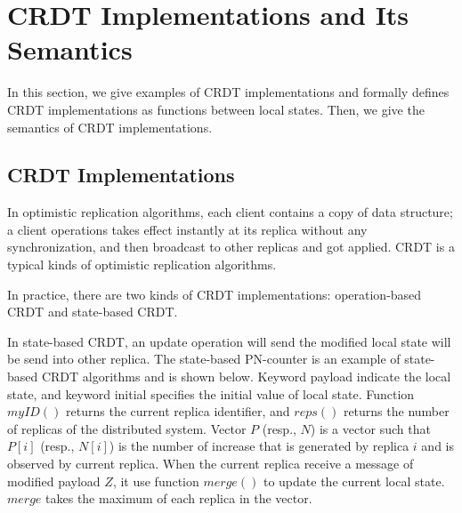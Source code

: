 
\section{CRDT Implementations and Its Semantics}
\label{sec:CRDT implementations and its semantics}

In this section, we give examples of CRDT implementations and formally defines CRDT implementations as functions between local states. Then, we give the semantics of CRDT implementations.


\subsection{CRDT Implementations}
\label{subsec:CRDT implementations}

In optimistic replication algorithms, each client contains a copy of data structure; a client operations takes effect instantly at its replica without any synchronization, and then broadcast to other replicas and got applied. CRDT is a typical kinds of optimistic replication algorithms. 

In practice, there are two kinds of CRDT implementations: operation-based CRDT and state-based CRDT. 

In state-based CRDT, an update operation will send the modified local state will be send into other replica. The state-based PN-counter is an example of state-based CRDT algorithms and is shown below. Keyword payload indicate the local state, and keyword initial specifies the initial value of local state. Function $myID()$ returns the current replica identifier, and $reps()$ returns the number of replicas of the distributed system. Vector $P$ (resp., $N$) is a vector such that $P[i]$ (resp., $N[i]$) is the number of increase that is generated by replica $i$ and is observed by current replica. When the current replica receive a message of modified payload $Z$, it use function $merge()$ to update the current local state. $merge$ takes the maximum of each replica in the vector. 

